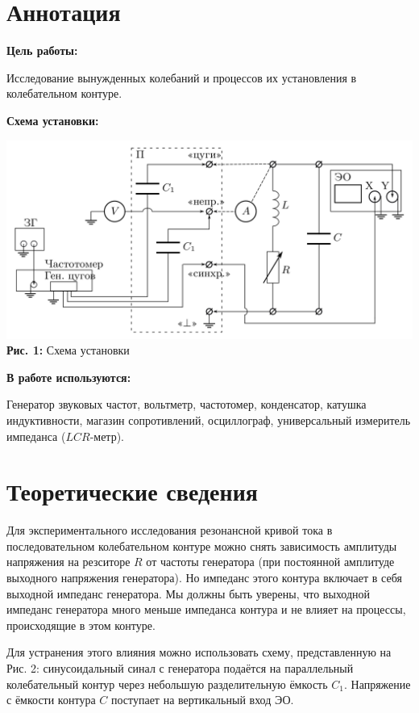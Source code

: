\documentclass[12pt,a4paper]{scrartcl}
\begin{document}
	\section{Аннотация}
	
	\textbf{Цель работы: }
	
	Исследование вынужденных колебаний и процессов их установления в колебательном контуре.
	
	\textbf{Схема установки:}
	\begin{center}
		\includegraphics[scale=0.2]{PIC_1}
		\\\textbf{Рис. 1:} Схема установки
	\end{center}	
		
	\textbf{В работе используются:}
	
	Генератор звуковых частот, вольтметр, частотомер, конденсатор, катушка индуктивности, магазин сопротивлений, осциллограф, универсальный измеритель импеданса ($LCR$-метр).
	
	\section{Теоретические сведения}
	Для экспериментального исследования резонансной кривой тока в последовательном колебательном контуре можно снять зависимость амплитуды напряжения на резситоре $R$ от частоты генератора (при постоянной амплитуде выходного напряжения генератора). Но импеданс этого контура включает в себя выходной импеданс генератора. Мы должны быть уверены, что выходной импеданс генератора много меньше импеданса контура и не влияет на процессы, происходящие в этом контуре.
	
	Для устранения этого влияния можно использовать схему, представленную на Рис. 2: синусоидальный синал с генератора подаётся на параллельный колебательный контур через небольшую разделительную ёмкость $C_1$. Напряжение с ёмкости контура $C$ поступает на вертикальный вход ЭО.
	
\end{document}
